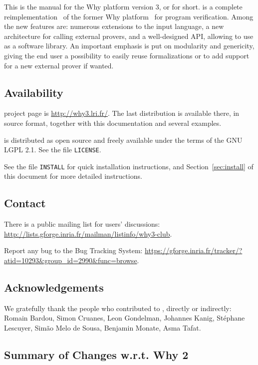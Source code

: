 \documentclass[a4paper,11pt,twoside,openright]{memoir}
\begin{document}
This is the manual for the Why platform version 3, or \why for
short. \why is a complete reimplementation~\cite{boogie11why3} of the former Why
platform~\cite{filliatre07cav} for program
verification. Among the new features are: numerous
extensions to the input language, a new architecture for calling
external provers, and a well-designed API, allowing to use \why as a
software library.  An important emphasis is put on modularity and
genericity, giving the end user a possibility to easily reuse \why
formalizations or to add support for a new external prover if wanted.

\subsection*{Availability}

\why project page is \url{http://why3.lri.fr/}.  The last distribution
is available there, in source format, together with this documentation
and several examples.

\why is distributed as open source and freely available under the
terms of the GNU LGPL 2.1. See the file \texttt{LICENSE}.

See the file \texttt{INSTALL} for quick installation instructions, and
Section~\ref{sec:install} of this document for more detailed
instructions.

\subsection*{Contact}

There is a public mailing list for users' discussions:
\url{http://lists.gforge.inria.fr/mailman/listinfo/why3-club}.

Report any bug to the \why Bug Tracking System:
\url{https://gforge.inria.fr/tracker/?atid=10293&group_id=2990&func=browse}.


\subsection*{Acknowledgements}

We gratefully thank the people who contributed to \why, directly or
indirectly: Romain Bardou, Simon Cruanes, Leon Gondelman, Johannes Kanig,
St\'ephane Lescuyer, Sim\~ao Melo de Sousa, Benjamin Monate, Asma Tafat.

\subsection*{Summary of Changes w.r.t. Why 2}
\end{document}
